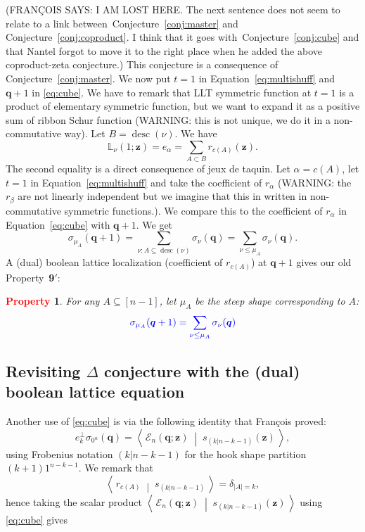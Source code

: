 \documentclass[12pt]{amsart}
\newcommand{\blue}[1]{\textcolor{blue}{#1}}
\newcommand{\red}[1]{\textcolor{red}{#1}}
\newcommand{\green}[1]{\textcolor{green!75!black}{#1}}
\theoremstyle{plain}
\newtheorem{property}{\red{Property}}
\theoremstyle{definition}
\theoremstyle{remark}
\newcommand{\Qvar}{{\bm q}}
\newcommand{\Zvar}{{\bm z}}
\newcommand{\desc}{\mathop{\mathrm{desc}}}
\newcommand{\dotprod}[2]{\left\langle \, #1 \; \middle| \; #2 \, \right\rangle} %
\begin{document}
(FRANÇOIS SAYS: I AM LOST HERE. The next sentence does not seem to relate to a link between~Conjecture~\ref{conj:master} and Conjecture~\ref{conj:coproduct}. I think that it goes with~Conjecture~\ref{conj:cube} and that Nantel forgot to move it to the right place when he added the above coproduct-zeta conjecture.)
This conjecture is a consequence of Conjecture~\ref{conj:master}. We  now put $t=1$ in Equation~\eqref{eq:multishuff}  and $\Qvar+1$ in \eqref{eq:cube}.
We have to remark that LLT symmetric function at $t=1$ is a product of elementary symmetric function, but we want to expand it as a positive sum of ribbon 
Schur function (\green{WARNING: this is not unique, we do it in a non-commutative way}). Let $B = \desc(\nu)$. We have
\[
{\mathbb L}_\nu(1;\Zvar)= e_{\alpha}=\sum_{A\subset B} r_{c(A)}(\Zvar).
\]
The second equality is a direct consequence of jeux de taquin. Let $\alpha=c(A)$, let $t=1$ in Equation~\eqref{eq:multishuff} and take the coefficient of $r_\alpha$
(\green{WARNING: the $r_\beta$ are not linearly independent but we imagine that this in written in non-commutative symmetric functions.}). We compare this to the coefficient of $r_\alpha$ in Equation~\eqref{eq:cube} with $\Qvar+1$. We get
\[
\sigma_{\mu_A}(\Qvar+1) = \sum_{\nu: A\subseteq \desc(\nu)} \sigma_\nu(\Qvar)= \sum_{\nu\le \mu_A} \sigma_\nu(\Qvar).
\]
A (dual) boolean lattice localization (coefficient of $r_{c(A)}$) at $\Qvar+1$   gives our old Property~{\bf 9$'$}:

\begin{property}\label{P:steepQ1}
For any $A\subseteq [n-1]$, let $\mu_A$ be the steep shape corresponding to $A$:
\[
\blue{\sigma_{\mu_A}(\Qvar+1) = \sum_{\nu\le \mu_A} \sigma_\nu(\Qvar)
}
\]
\end{property}

\subsection{Revisiting $\Delta$ conjecture with the (dual) boolean lattice equation}

Another use of \eqref{eq:cube} is via the following identity that Fran\c{c}ois proved:
\[
e_k^\perp \sigma_{0^n}(\Qvar) = \dotprod{{\mathcal E}_n(\Qvar;\Zvar)}{s_{(k | n-k-1)}(\Zvar)},
\]
using Frobenius notation $(k | n-k-1)$ for the hook shape partition $(k+1)1^{n-k-1}$.
We remark that
\[
\dotprod{r_{c(A)}}{s_{(k | n-k-1)}} = \delta_{|A|=k},
\]
hence taking the scalar product $\dotprod{{\mathcal E}_n(\Qvar;\Zvar)}{s_{(k | n-k-1)}(\Zvar)}$ using \eqref{eq:cube} gives
\end{document}
